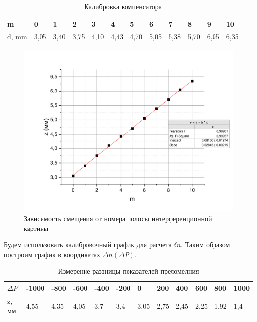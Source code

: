 \documentclass[12pt]{article}
\begin{document}
	
	\begin{table}[h!]
	\caption{Калибровка компенсатора}
\begin{tabular}{|l|l|l|l|l|l|l|l|l|l|l|l|}
\hline
m & 0    & 1   & 2    & 3   & 4    & 5   & 6    & 7    & 8   & 9    & 10   \\ \hline
d, mm & 3,05 & 3,40 & 3,75 & 4,10 & 4,43 & 4,70 & 5,05 & 5,38 & 5,70 & 6,05 & 6,35 \\ \hline
\end{tabular}
\end{table}
	\begin{figure}[h!]
		\begin{center}
			\includegraphics[width = 1.1\linewidth]{calibr}
			\caption{Зависимость смещения от номера полосы интерференционной картины}
		\end{center}
	\end{figure}
	\newpage
	Будем использовать калибровочный график для расчета $\delta n$. Таким образом построим график в координатах $\Delta n\left(\Delta P\right)$.\\
	
	\begin{table}[h!]
	\caption{Измерение раззницы показателей преломелния}
\begin{tabular}{|l|l|l|l|l|l|l|l|l|l|l|l|}
\hline
$\Delta P$ & -1000 & -800 & -600 & -400 & -200 & 0    & 200  & 400  & 600  & 800  & 1000 \\ \hline
z, мм  & 4,55  & 4,35 & 4,05 & 3,7  & 3,4  & 3,05 & 2,75 & 2,45 & 2,25 & 1,92 & 1,4  \\ \hline
\end{tabular}
\end{table}
	
\end{document}
